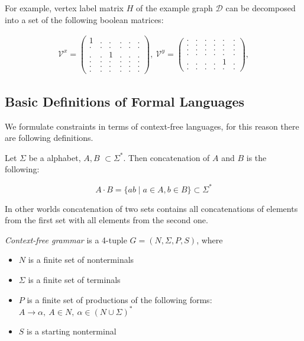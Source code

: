 For example, vertex label matrix $H$ of the example graph $\mathcal{D}$ can be decomposed into a set of the following boolean matrices:

\begin{align*}
\mathcal{V}^x =
\begin{pmatrix}
    1 & . & . & . & . & .   \\
    . & . & . & . & . & . \\
    . & . & 1 & . & . & .\\
    . & . & . & . & . & . \\ 
    . & . & . & . & . & . \\ 
    . & . & . & . & . & .
\end{pmatrix},~ 
\mathcal{V}^y =
\begin{pmatrix}
    . & . & . & . & . & .   \\
    . & . & . & . & . & . \\
    . & . & . & . & . & .\\
    . & . & . & . & . & . \\ 
    . & . & . & . & 1 & . \\ 
    . & . & . & . & . & .
\end{pmatrix},  \label{eq:boolean_decomposition_of_graph}
\end{align*}

\subsection{Basic Definitions of Formal Languages}
We formulate constraints in terms of context-free languages, for this reason there are following definitions.

\begin{definition}
Let $\Sigma$ be a alphabet, $A, B$ $\subset \Sigma^*$. Then concatenation of $A$ and $B$ is the following:

$$A \cdot B = \{a b \mid a \in A, b \in B\} \subset \Sigma^*$$

In other worlds concatenation of two sets contains all concatenations of elements from the first set with all elements from the second one.

\end{definition}

\begin{definition}\emph{Context-free grammar} is a 4-tuple $G=(N, \Sigma, P, S)$, where 
\begin{itemize}
    \item $N$ is a finite set of nonterminals
    \item $\Sigma$ is a finite set of terminals
    \item $P$ is a finite set of productions of the following forms: $A \to \alpha, ~A \in N,~ \alpha \in (N \cup \Sigma)^*$
    \item $S$ is a starting nonterminal
\end{itemize}
\end{definition}

